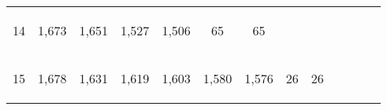 \begin{center}
\begin{tabular}{lcccccccccccc}
14 & \begin{bf}1,673\end{bf} & \begin{rm}1,651\end{rm} & \begin{bf}1,527\end{bf} & \begin{rm}1,506\end{rm} & \begin{bf}65\end{bf} & \begin{rm}65\end{rm} & \begin{bf}\end{bf} & \begin{rm}\end{rm} & \begin{bf}\end{bf} & \begin{rm}\end{rm} & \begin{bf}\end{bf} & \begin{rm}\end{rm}\\
15 & \begin{bf}1,678\end{bf} & \begin{rm}1,631\end{rm} & \begin{bf}1,619\end{bf} & \begin{rm}1,603\end{rm} & \begin{bf}1,580\end{bf} & \begin{rm}1,576\end{rm} & \begin{bf}26\end{bf} & \begin{rm}26\end{rm} & \begin{bf}\end{bf} & \begin{rm}\end{rm} & \begin{bf}\end{bf} & \begin{rm}\end{rm}\\

\end{tabular}
\end{center}
